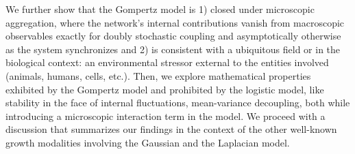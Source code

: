 \documentclass{article}
\begin{document}
We further show that the Gompertz model is 1) closed under microscopic aggregation, where the network's internal contributions vanish from macroscopic observables exactly for doubly stochastic coupling and asymptotically otherwise as the system synchronizes and 2) is consistent with a ubiquitous field or in the biological context: an environmental stressor external to the entities involved (animals, humans, cells, etc.). Then, we explore mathematical properties exhibited by the Gompertz model and prohibited by the logistic model, like stability in the face of internal fluctuations, mean-variance decoupling, both while introducing a microscopic interaction term in the model. We proceed with a discussion that summarizes our findings in the context of the other well-known growth modalities involving the Gaussian and the Laplacian model.



  
\end{document}
